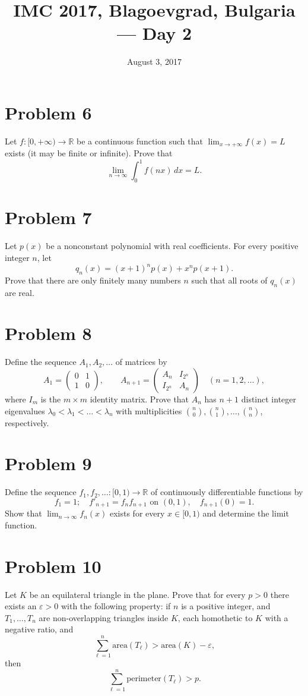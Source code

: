 \documentclass{article}
\title{IMC 2017, Blagoevgrad, Bulgaria --- Day 2}
\date{August 3, 2017}
\begin{document}
\maketitle

\section*{Problem 6}
Let $f : [0, +\infty) \to \mathbb{R}$ be a continuous function such that $\lim_{x \to +\infty} f(x) = L$ exists (it may be finite or infinite). Prove that
\[ \lim_{n \to \infty} \int_0^1 f(nx)\,dx = L. \]

\section*{Problem 7}
Let $p(x)$ be a nonconstant polynomial with real coefficients. For every positive integer $n$, let
\[ q_n(x) = (x+1)^n p(x) + x^n p(x+1). \]
Prove that there are only finitely many numbers $n$ such that all roots of $q_n(x)$ are real.

\section*{Problem 8}
Define the sequence $A_1, A_2, \dots$ of matrices by
\[ A_1 = \begin{pmatrix} 0 & 1 \\ 1 & 0 \end{pmatrix}, \qquad A_{n+1} = \begin{pmatrix} A_n & I_{2^n} \\ I_{2^n} & A_n \end{pmatrix} \quad (n=1,2,\dots), \]
where $I_m$ is the $m \times m$ identity matrix. Prove that $A_n$ has $n+1$ distinct integer eigenvalues $\lambda_0 < \lambda_1 < \dots < \lambda_n$ with multiplicities $\binom{n}{0}, \binom{n}{1}, \dots, \binom{n}{n}$, respectively.

\section*{Problem 9}
Define the sequence $f_1, f_2, \dots : [0,1) \to \mathbb{R}$ of continuously differentiable functions by
\[ f_1 = 1; \quad f'_{n+1} = f_n f_{n+1} \text{ on } (0,1), \quad f_{n+1}(0) = 1. \]
Show that $\lim_{n\to\infty} f_n(x)$ exists for every $x \in [0,1)$ and determine the limit function.

\section*{Problem 10}
Let $K$ be an equilateral triangle in the plane. Prove that for every $p > 0$ there exists an $\varepsilon > 0$ with the following property: if $n$ is a positive integer, and $T_1, \dots, T_n$ are non-overlapping triangles inside $K$, each homothetic to $K$ with a negative ratio, and
\[ \sum_{\ell=1}^n \mathrm{area}(T_\ell) > \mathrm{area}(K) - \varepsilon, \]
then
\[ \sum_{\ell=1}^n \mathrm{perimeter}(T_\ell) > p. \]
\end{document}
